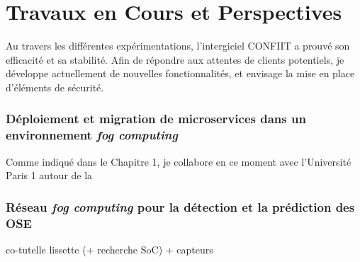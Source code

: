 \section{Travaux en Cours et Perspectives}

Au travers les différentes expérimentations, l'intergiciel CONFIIT a prouvé son efficacité et sa stabilité. Afin de répondre aux attentes de clients potentiels, je développe actuellement de nouvelles fonctionnalités, et envisage la mise en place d’éléments de sécurité.



\subsubsection*{Déploiement et migration de microservices dans un environnement \textit{fog computing}}

Comme indiqué dans le Chapitre 1, je collabore en ce moment avec l'Université Paris 1 autour de la 


\subsubsection*{Réseau \textit{fog computing} pour la détection et la prédiction des OSE}


co-tutelle lissette (+ recherche SoC) + capteurs 
